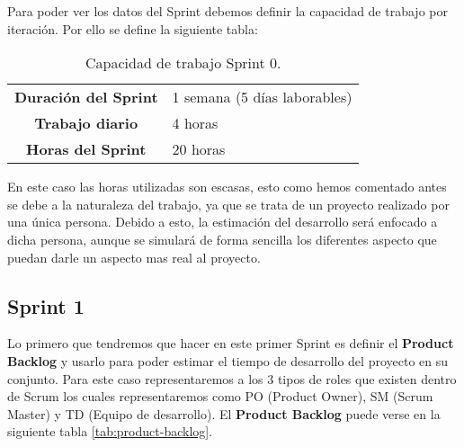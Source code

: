 Para poder ver los datos del Sprint debemos definir la capacidad de trabajo por iteración. Por ello se define la siguiente tabla:

\begin{table}[H]
	\begin{center}
		\begin{tabular}{| c | p{9cm} |}
			\hline

			\textbf{Duración del Sprint} & 1 semana (5 días laborables) \\
			\textbf{Trabajo diario} & 4 horas \\
			\textbf{Horas del Sprint} & 20 horas \\ \hline
		\end{tabular}
		\caption{Capacidad de trabajo Sprint 0.}
	\end{center}
\end{table}

En este caso las horas utilizadas son escasas, esto como hemos comentado antes se debe a la naturaleza del trabajo, ya que se trata de un proyecto realizado por una única persona. Debido a esto, la estimación del desarrollo será enfocado a dicha persona, aunque se simulará de forma sencilla los diferentes aspecto que puedan darle un aspecto mas real al proyecto.

\subsection{Sprint 1}

Lo primero que tendremos que hacer en este primer Sprint es definir el \textbf{Product Backlog} y usarlo para poder estimar el tiempo de desarrollo del proyecto en su conjunto. Para este caso representaremos a los 3 tipos de roles que existen dentro de Scrum los cuales representaremos como PO (Product Owner), SM (Scrum Master) y TD (Equipo de desarrollo). El \textbf{Product Backlog} puede verse en la siguiente tabla \ref{tab:product-backlog}.

